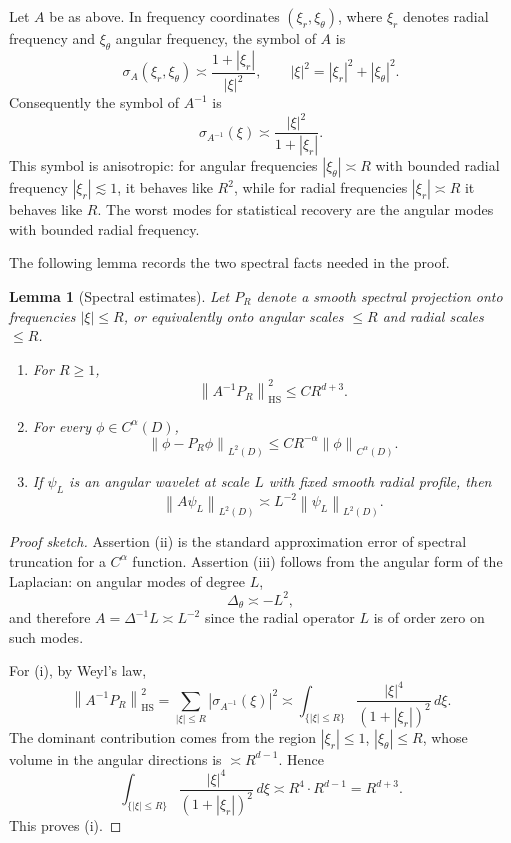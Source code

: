 \documentclass{article}
\newtheorem{lemma}[theorem]{Lemma}
\theoremstyle{remark}
\newcommand{\norm}[1]{\left\|#1\right\|}
\newcommand{\abs}[1]{\left|#1\right|}
\begin{document}
Let \(A\) be as above. In frequency coordinates \((\xi_r,\xi_\theta)\), where \(\xi_r\) denotes radial frequency and \(\xi_\theta\) angular frequency, the symbol of \(A\) is
\[
\sigma_A(\xi_r,\xi_\theta)
\asymp \frac{1+|\xi_r|}{|\xi|^2},\qquad |\xi|^2=|\xi_r|^2+|\xi_\theta|^2.
\]
Consequently the symbol of \(A^{-1}\) is
\[
\sigma_{A^{-1}}(\xi)\asymp \frac{|\xi|^2}{1+|\xi_r|}.
\]
This symbol is anisotropic: for angular frequencies \(|\xi_\theta|\asymp R\) with bounded radial frequency \(|\xi_r|\lesssim 1\), it behaves like \(R^2\), while for radial frequencies \(|\xi_r|\asymp R\) it behaves like \(R\). The worst modes for statistical recovery are the angular modes with bounded radial frequency.

The following lemma records the two spectral facts needed in the proof.

\begin{lemma}[Spectral estimates]\label{lem:spectral}
Let \(P_R\) denote a smooth spectral projection onto frequencies \(|\xi|\le R\), or equivalently onto angular scales \(\le R\) and radial scales \(\le R\).
\begin{enumerate}
\item[(i)] For \(R\ge 1\),
\[
\norm{A^{-1}P_R}_{\mathrm{HS}}^2
\le C R^{d+3}.
\]
\item[(ii)] For every \(\phi\in C^\alpha(D)\),
\[
\norm{\phi-P_R\phi}_{L^2(D)}
\le C R^{-\alpha}\norm{\phi}_{C^\alpha(D)}.
\]
\item[(iii)] If \(\psi_L\) is an angular wavelet at scale \(L\) with fixed smooth radial profile, then
\[
\norm{A\psi_L}_{L^2(D)}\asymp L^{-2}\norm{\psi_L}_{L^2(D)}.
\]
\end{enumerate}
\end{lemma}

\begin{proof}[Proof sketch]
Assertion (ii) is the standard approximation error of spectral truncation for a \(C^\alpha\) function. Assertion (iii) follows from the angular form of the Laplacian: on angular modes of degree \(L\),
\[
\Delta_\theta\asymp -L^2,
\]
and therefore \(A=\Delta^{-1}L\asymp L^{-2}\) since the radial operator \(L\) is of order zero on such modes.

For (i), by Weyl's law,
\[
\norm{A^{-1}P_R}_{\mathrm{HS}}^2
=\sum_{|\xi|\le R} \abs{\sigma_{A^{-1}}(\xi)}^2
\asymp \int_{\{|\xi|\le R\}}
\frac{|\xi|^4}{(1+|\xi_r|)^2}\,d\xi.
\]
The dominant contribution comes from the region \(|\xi_r|\le 1\), \(|\xi_\theta|\le R\), whose volume in the angular directions is \(\asymp R^{d-1}\). Hence
\[
\int_{\{|\xi|\le R\}}
\frac{|\xi|^4}{(1+|\xi_r|)^2}\,d\xi
\asymp R^4\cdot R^{d-1}=R^{d+3}.
\]
This proves (i).
\end{proof}
\end{document}
